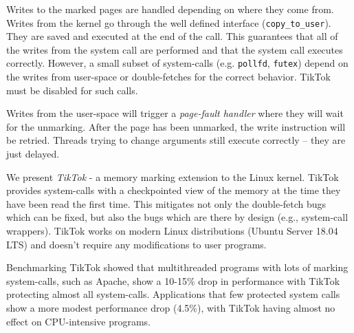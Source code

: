 
Writes to the marked pages are handled depending on where they come from. Writes
from the kernel go through the well defined interface (\texttt{copy\_to\_user}).
They are saved and executed at the end of the call. This guarantees that all of
the writes from the system call are performed and that the system call executes
correctly. However, a small subset of system-calls (e.g. \texttt{pollfd},
\texttt{futex}) depend on the writes from user-space or double-fetches for the
correct behavior. TikTok must be disabled for such calls.

Writes from the user-space will trigger a \emph{page-fault handler} where they
will wait for the unmarking. After the page has been unmarked, the write
instruction will be retried. Threads trying to change arguments still execute
correctly -- they are just delayed.



We present \emph{TikTok} - a memory marking extension to the Linux kernel. TikTok
provides system-calls with a checkpointed view of the memory at the time they
have been read the first time. This mitigates not only the double-fetch bugs
which can be fixed, but also the bugs which are there by design (e.g., system-call
wrappers). TikTok works on modern Linux distributions (Ubuntu Server 18.04 LTS)
and doesn't require any modifications to user programs.

Benchmarking TikTok showed that multithreaded programs with lots of marking
system-calls, such as Apache, show a 10-15\% drop in performance with TikTok
protecting almost all system-calls. Applications that few protected system calls
show a more modest performance drop (4.5\%), with TikTok having almost no effect
on CPU-intensive programs.

